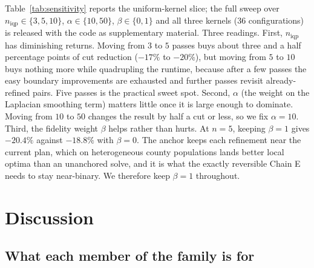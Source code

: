 \documentclass[11pt]{article}
\begin{document}
Table~\ref{tab:sensitivity} reports the uniform-kernel slice; the
full sweep over $n_{\mathrm{iqp}} \in \{3,5,10\}$,
$\alpha \in \{10,50\}$, $\beta \in \{0,1\}$ and all three kernels
(36 configurations) is released with the code as supplementary
material. Three readings. First, $n_{\mathrm{iqp}}$ has diminishing
returns.
Moving from $3$ to $5$ passes buys about three and a half percentage
points of cut reduction ($-17\%$ to $-20\%$), but moving from $5$ to
$10$ buys nothing more while quadrupling the runtime, because after a
few passes the easy boundary improvements are exhausted and further
passes revisit already-refined pairs. Five passes is the practical
sweet spot. Second, $\alpha$ (the weight on the Laplacian smoothing
term) matters little once it is large enough to dominate. Moving from
$10$ to $50$ changes the result by half a cut or less, so we fix
$\alpha = 10$. Third, the
fidelity weight $\beta$ helps rather than hurts. At $n = 5$, keeping
$\beta = 1$ gives $-20.4\%$ against $-18.8\%$ with $\beta = 0$. The
anchor keeps each refinement near the current plan, which on
heterogeneous county populations lands better local optima than an
unanchored solve, and it is what the exactly reversible Chain E needs
to stay near-binary. We therefore keep $\beta = 1$ throughout.

\section{Discussion}\label{sec:discussion}

\subsection{What each member of the family is for}\label{sec:disc-roles}
\end{document}
